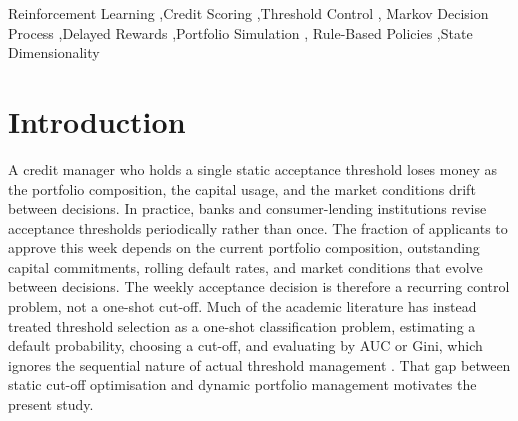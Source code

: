 \documentclass[preprint,review,authoryear,12pt]{elsarticle}
\begin{document}
\begin{frontmatter}
\begin{abstract}
        baseline at every dimension, and it undercuts both profit-seeking baselines on default
        rate in at most two of six scenarios. A delayed-evaluation check in the adverse-stress
        scenario shows near parity between DQN and the static-threshold baseline early in the
        horizon and a large, highly significant DQN advantage by the horizon midpoint,
        supporting a ``locally tied, globally better'' pattern. Episode-static behavior, in
        which a controller fixes a threshold pair at the start of an episode and barely
        adjusts it, is no longer universal: it is specific to the DQN family at 12--30D and to
        PPO, while SAC and the actor-critic agents adjust thresholds within the episode at
        every dimension. We conclude that, given a sufficient training budget, RL comes within
        a few percent of well-designed rule-based weekly threshold search on profit, but the
        strongest rule-based policies still win the primary reward ranking in every scenario
        and dimension tested, and we find no robust risk-side advantage for RL.
    \end{abstract}

    \begin{keyword}
        Reinforcement Learning \sep Credit Scoring \sep Threshold Control \sep
        Markov Decision Process \sep Delayed Rewards \sep Portfolio Simulation \sep
        Rule-Based Policies \sep State Dimensionality
    \end{keyword}

\end{frontmatter}

\section{Introduction}

A credit manager who holds a single static acceptance threshold loses money as the
portfolio composition, the capital usage, and the market conditions drift between
decisions. In practice, banks and consumer-lending institutions revise acceptance
thresholds periodically rather than once. The fraction of applicants to approve this
week depends on the current portfolio composition, outstanding capital commitments,
rolling default rates, and market conditions that evolve between decisions. The weekly
acceptance decision is therefore a recurring control problem, not a one-shot cut-off.
Much of the academic literature has instead treated threshold selection as a one-shot
classification problem, estimating a default probability, choosing a cut-off, and
evaluating by AUC or Gini, which ignores the sequential nature of actual threshold
management \citep{thomas2017, lessmann2015}. That gap between static cut-off
optimisation and dynamic portfolio management motivates the present study.
\end{document}
